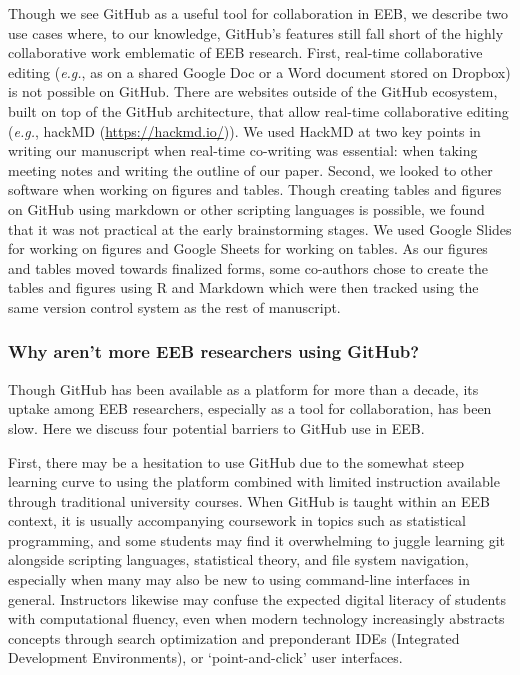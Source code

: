 Though we see GitHub as a useful tool for collaboration in EEB, we describe two use cases where, to our knowledge, GitHub's features still fall short of the highly collaborative work emblematic of EEB research.
First, real-time collaborative editing (\emph{e.g.}, as on a shared Google Doc or a Word document stored on Dropbox) is not possible on GitHub.
There are websites outside of the GitHub ecosystem, built on top of the GitHub architecture, that allow real-time collaborative editing (\emph{e.g.}, hackMD (\url{https://hackmd.io/})).
We used HackMD at two key points in writing our manuscript when real-time co-writing was essential: when taking meeting notes and writing the outline of our paper.
Second, we looked to other software when working on figures and tables.
Though creating tables and figures on GitHub using markdown or other scripting languages is possible, we found that it was not practical at the early brainstorming stages.
We used Google Slides for working on figures and Google Sheets for working on tables.
As our figures and tables moved towards finalized forms, some co-authors chose to create the tables and figures using R and Markdown which were then tracked using the same version control system as the rest of manuscript.

\hypertarget{why-arent-more-eeb-researchers-using-github}{%
\subsubsection{Why aren't more EEB researchers using GitHub?}\label{why-arent-more-eeb-researchers-using-github}}

Though GitHub has been available as a platform for more than a decade, its uptake among EEB researchers, especially as a tool for collaboration, has been slow.
Here we discuss four potential barriers to GitHub use in EEB.

First, there may be a hesitation to use GitHub due to the somewhat steep learning curve to using the platform combined with limited instruction available through traditional university courses.
When GitHub is taught within an EEB context, it is usually accompanying coursework in topics such as statistical programming, and some students may find it overwhelming to juggle learning git alongside scripting languages, statistical theory, and file system navigation, especially when many may also be new to using command-line interfaces in general.
Instructors likewise may confuse the expected digital literacy of students with computational fluency, even when modern technology increasingly abstracts concepts through search optimization and preponderant IDEs (Integrated Development Environments), or `point-and-click' user interfaces.


